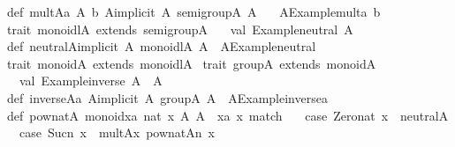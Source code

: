 \begin{isabellebody}
\begin{isamarkuptext}
{\isacharbraceright}\isanewline
def\ mult{\isacharbrackleft}A{\isacharbrackright}{\isacharparenleft}a{\isacharcolon}\ A{\isacharcomma}\ b{\isacharcolon}\ A{\isacharparenright}{\isacharparenleft}implicit\ A{\isacharcolon}\ semigroup{\isacharbrackleft}A{\isacharbrackright}{\isacharparenright}{\isacharcolon}\ A\ {\isacharequal}\isanewline
\ \ A{\isachardot}{\isacharbackquote}Example{\isachardot}mult{\isacharbackquote}{\isacharparenleft}a{\isacharcomma}\ b{\isacharparenright}\isanewline
\isanewline
trait\ monoidl{\isacharbrackleft}A{\isacharbrackright}\ extends\ semigroup{\isacharbrackleft}A{\isacharbrackright}\ {\isacharbraceleft}\isanewline
\ \ val\ {\isacharbackquote}Example{\isachardot}neutral{\isacharbackquote}{\isacharcolon}\ A\isanewline
{\isacharbraceright}\isanewline
def\ neutral{\isacharbrackleft}A{\isacharbrackright}{\isacharparenleft}implicit\ A{\isacharcolon}\ monoidl{\isacharbrackleft}A{\isacharbrackright}{\isacharparenright}{\isacharcolon}\ A\ {\isacharequal}\ A{\isachardot}{\isacharbackquote}Example{\isachardot}neutral{\isacharbackquote}\isanewline
\isanewline
trait\ monoid{\isacharbrackleft}A{\isacharbrackright}\ extends\ monoidl{\isacharbrackleft}A{\isacharbrackright}\ {\isacharbraceleft}\isanewline
{\isacharbraceright}\isanewline
\isanewline
trait\ group{\isacharbrackleft}A{\isacharbrackright}\ extends\ monoid{\isacharbrackleft}A{\isacharbrackright}\ {\isacharbraceleft}\isanewline
\ \ val\ {\isacharbackquote}Example{\isachardot}inverse{\isacharbackquote}{\isacharcolon}\ A\ {\isacharequal}{\isachargreater}\ A\isanewline
{\isacharbraceright}\isanewline
def\ inverse{\isacharbrackleft}A{\isacharbrackright}{\isacharparenleft}a{\isacharcolon}\ A{\isacharparenright}{\isacharparenleft}implicit\ A{\isacharcolon}\ group{\isacharbrackleft}A{\isacharbrackright}{\isacharparenright}{\isacharcolon}\ A\ {\isacharequal}\ A{\isachardot}{\isacharbackquote}Example{\isachardot}inverse{\isacharbackquote}{\isacharparenleft}a{\isacharparenright}\isanewline
\isanewline
def\ pow{\isacharunderscore}nat{\isacharbrackleft}A{\isacharcolon}\ monoid{\isacharbrackright}{\isacharparenleft}xa{}{\isacharcolon}\ nat{\isacharcomma}\ x{\isacharcolon}\ A{\isacharparenright}{\isacharcolon}\ A\ {\isacharequal}\ {\isacharparenleft}xa{}{\isacharcomma}\ x{\isacharparenright}\ match\ {\isacharbraceleft}\isanewline
\ \ case\ {\isacharparenleft}Zero{\isacharunderscore}nat{\isacharcomma}\ x{\isacharparenright}\ {\isacharequal}{\isachargreater}\ neutral{\isacharbrackleft}A{\isacharbrackright}\isanewline
\ \ case\ {\isacharparenleft}Suc{\isacharparenleft}n{\isacharparenright}{\isacharcomma}\ x{\isacharparenright}\ {\isacharequal}{\isachargreater}\ mult{\isacharbrackleft}A{\isacharbrackright}{\isacharparenleft}x{\isacharcomma}\ pow{\isacharunderscore}nat{\isacharbrackleft}A{\isacharbrackright}{\isacharparenleft}n{\isacharcomma}\ x{\isacharparenright}{\isacharparenright}\isanewline

\end{isamarkuptext}
\end{isabellebody}
